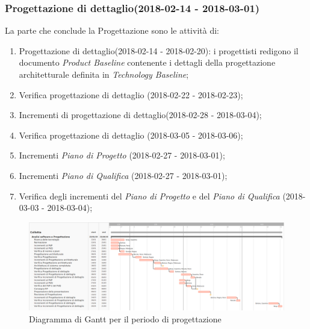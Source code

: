 		\subsubsection{Progettazione di dettaglio(2018-02-14 - 2018-03-01)\\} La parte che conclude la Progettazione sono le attività di:
			\begin{enumerate}
				\item Progettazione di dettaglio(2018-02-14 - 2018-02-20): i progettisti redigono il documento \textit{Product Baseline} contenente i dettagli della progettazione architetturale definita in \textit{Technology Baseline};
				\item Verifica progettazione di dettaglio (2018-02-22 - 2018-02-23);
				\item Incrementi di progettazione di dettaglio(2018-02-28 - 2018-03-04);
				\item Verifica progettazione di dettaglio (2018-03-05 - 2018-03-06);
				\item Incrementi \textit{Piano di Progetto} (2018-02-27 - 2018-03-01);
				\item Incrementi \textit{Piano di Qualifica} (2018-02-27 - 2018-03-01);	
				\item Verifica degli incrementi del \textit{Piano di Progetto} e del \textit{Piano di Qualifica} (2018-03-03 - 2018-03-04);
			\end{enumerate}
	\begin{figure}[!hbtp]
		\centering
		\includegraphics[scale=0.5,angle=90]{images/ganttprog.png}
		\caption{Diagramma di Gantt per il periodo di progettazione}
	\end{figure}
	\newpage